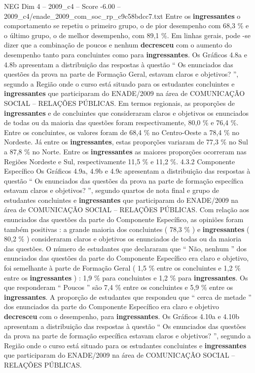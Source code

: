 \begin{textsample}{NEG Dim 4 – 2009\_c4 – Score -6.00 – 2009\_c4/enade\_2009\_com\_soc\_rp\_c9c58bdcc7.txt}
Entre os \textbf{ingressantes} o comportamento se repetiu o primeiro grupo, o de pior desempenho com 68,3 \% e o último grupo, o de melhor desempenho, com 89,1 \%.
Em linhas gerais, pode -se dizer que a combinação de poucos e nenhum \textbf{decresceu} com o aumento do desempenho tanto para concluintes como para \textbf{ingressantes}.
Os Gráficos 4.8a e 4.8b apresentam a distribuição das respostas à questão “ Os enunciados das questões da prova na parte de Formação Geral, estavam claros e objetivos? ”, segundo a Região onde o curso está situado para os estudantes concluintes e \textbf{ingressantes} que participaram do ENADE/2009 na área de COMUNICAÇÃO SOCIAL – RELAÇÕES PÚBLICAS.
Em termos regionais, as proporções de \textbf{ingressantes} e de concluintes que consideraram claros e objetivos os enunciados de todas ou da maioria das questões foram respectivamente, 80,0 \% e 76,4 \%.
Entre os concluintes, os valores foram de 68,4 \% no Centro-Oeste a 78,4 \% no Nordeste.
Já entre os \textbf{ingressantes}, estas proporções variaram de 77,3 \% no Sul a 87,8 \% no Norte.
Entre os \textbf{ingressantes} as maiores proporções ocorreram nas Regiões Nordeste e Sul, respectivamente 11,5 \% e 11,2 \%. 4.3.2 Componente Específico Os Gráficos 4.9a, 4.9b e 4.9c apresentam a distribuição das respostas à questão “ Os enunciados das questões da prova na parte de formação específica estavam claros e objetivos? ”, segundo quartos de nota final e grupo de estudantes concluintes e \textbf{ingressantes} que participaram do ENADE/2009 na área de COMUNICAÇÃO SOCIAL – RELAÇÕES PÚBLICAS.
Com relação aos enunciados das questões da parte do Componente Específico, as opiniões foram também positivas : a grande maioria dos concluintes ( 78,3 \% ) e \textbf{ingressantes} ( 80,2 \% ) consideraram claros e objetivos os enunciados de todas ou da maioria das questões.
O número de estudantes que declararam que “ Não, nenhum ” dos enunciados das questões da parte do Componente Específico era claro e objetivo, foi semelhante à parte de Formação Geral ( 1,5 \% entre os concluintes e 1,2 \% entre os \textbf{ingressantes} ) : 1,9 \% para concluintes e 1,2 \% para \textbf{ingressantes}.
Os que responderam “ Poucos ” são 7,4 \% entre os concluintes e 5,9 \% entre os \textbf{ingressantes}.
A proporção de estudantes que respondeu que “ cerca de metade ” dos enunciados da parte do Componente Específico era claro e objetivo \textbf{decresceu} com o desempenho, para \textbf{ingressantes}.
Os Gráficos 4.10a e 4.10b apresentam a distribuição das respostas à questão “ Os enunciados das questões da prova na parte de formação específica estavam claros e objetivos? ”, segundo a Região onde o curso está situado para os estudantes concluintes e \textbf{ingressantes} que participaram do ENADE/2009 na área de COMUNICAÇÃO SOCIAL – RELAÇÕES PÚBLICAS.

\end{textsample}
